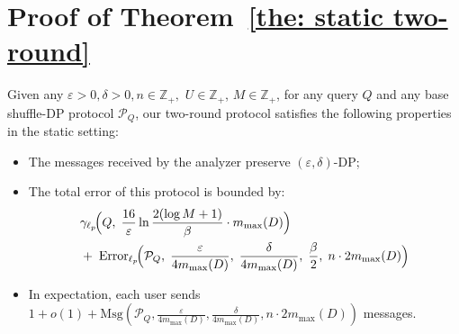 \clearpage
\appendix
\renewcommand{\thetheorem}{4.\arabic{theorem}}
\setcounter{theorem}{0} 
\section{Proof of Theorem~\ref{the: static two-round}}

\label{sec:Proof of static two}


\begin{theorem} 
    Given any $\varepsilon > 0, \delta >0, n \in \mathbb{Z}_+, $ $U \in \mathbb{Z}_{+}$, $M \in \mathbb{Z}_{+}$, for any query $Q$ and any base shuffle-DP protocol $\mathcal{P}_Q$, our two-round protocol satisfies the following properties in the static setting:

    \begin{itemize}
    \item The messages received by the analyzer preserve $(\varepsilon,\delta)$-DP;
    \item The total error of this protocol is bounded by:
    \[
    \begin{aligned}
    &\mathrm{\gamma}_{\ell_p}\!\Big(
        Q,\;
        \frac{16}{\varepsilon}\ln\frac{2(\log M +1)}{\beta} \cdot m_{\max}(D)
    \Big)
    \\
    &+\;
    \mathrm{Error}_{\ell_p}\!\Big(
        \mathcal{P}_Q,\;
        \frac{\varepsilon}{4m_{\max}(D)},\;
        \frac{\delta}{4m_{\max}(D)},\;
        \frac{\beta}{2},\;
        n\cdot 2m_{\max}(D)
    \Big)
    \end{aligned}
    \]



    \item In expectation, each user sends $1+ o(1)+\mathrm{Msg}(\mathcal{P}_Q, \allowbreak \frac{\varepsilon}{4m_{\max}(D)}, \allowbreak \frac{\delta}{4m_{\max}(D)}, \allowbreak n\cdot 2m_{\max}(D))$ messages.

\end{itemize}

\end{theorem}

